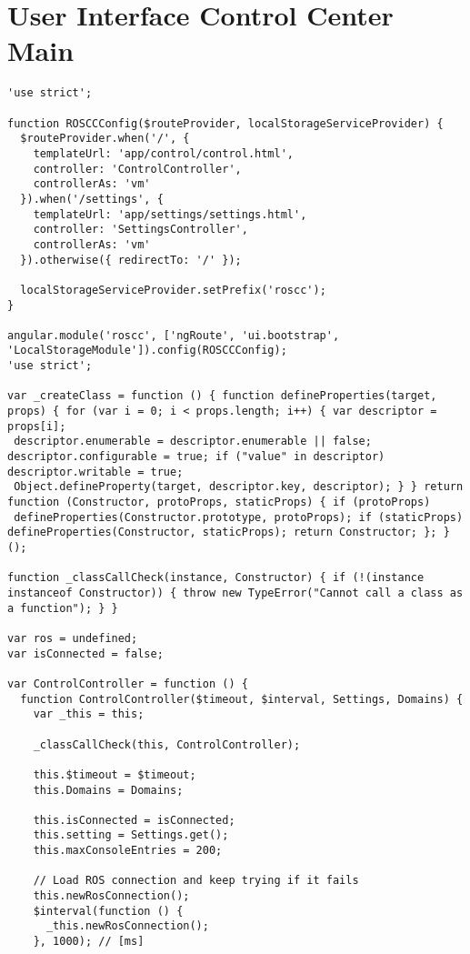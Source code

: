 \section*{User Interface Control Center Main}
\begin{lstlisting}[breaklines=true,basicstyle=\tiny]
'use strict';

function ROSCCConfig($routeProvider, localStorageServiceProvider) {
  $routeProvider.when('/', {
    templateUrl: 'app/control/control.html',
    controller: 'ControlController',
    controllerAs: 'vm'
  }).when('/settings', {
    templateUrl: 'app/settings/settings.html',
    controller: 'SettingsController',
    controllerAs: 'vm'
  }).otherwise({ redirectTo: '/' });

  localStorageServiceProvider.setPrefix('roscc');
}

angular.module('roscc', ['ngRoute', 'ui.bootstrap', 'LocalStorageModule']).config(ROSCCConfig);
'use strict';

var _createClass = function () { function defineProperties(target, props) { for (var i = 0; i < props.length; i++) { var descriptor = props[i];
 descriptor.enumerable = descriptor.enumerable || false; descriptor.configurable = true; if ("value" in descriptor) descriptor.writable = true; 
 Object.defineProperty(target, descriptor.key, descriptor); } } return function (Constructor, protoProps, staticProps) { if (protoProps) 
 defineProperties(Constructor.prototype, protoProps); if (staticProps) defineProperties(Constructor, staticProps); return Constructor; }; }();

function _classCallCheck(instance, Constructor) { if (!(instance instanceof Constructor)) { throw new TypeError("Cannot call a class as a function"); } }

var ros = undefined;
var isConnected = false;

var ControlController = function () {
  function ControlController($timeout, $interval, Settings, Domains) {
    var _this = this;

    _classCallCheck(this, ControlController);

    this.$timeout = $timeout;
    this.Domains = Domains;

    this.isConnected = isConnected;
    this.setting = Settings.get();
    this.maxConsoleEntries = 200;

    // Load ROS connection and keep trying if it fails
    this.newRosConnection();
    $interval(function () {
      _this.newRosConnection();
    }, 1000); // [ms]


\end{lstlisting}

